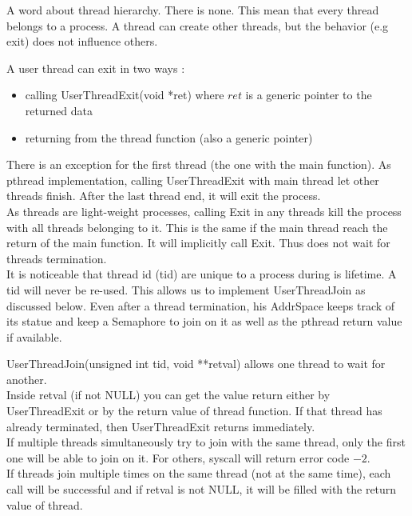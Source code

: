 A word about thread hierarchy. There is none. This mean that every thread
belongs to a process. A thread can create other threads, but the behavior (e.g
exit) does not influence others.

A user thread can exit in two ways :
\begin{itemize}
    \item calling \textrm{UserThreadExit(void *ret)} where $ret$ is a generic
        pointer to the returned data
    \item returning from the thread function (also a generic pointer)
\end{itemize}

There is an exception for the first thread (the one with the main function). As
pthread implementation, calling \textrm{UserThreadExit} with main thread let
other threads finish. After the last thread end, it will exit the process.\\

As threads are light-weight processes, calling \textrm{Exit} in any threads
kill the process with all threads belonging to it. This is the same if the main
thread reach the return of the main function. It will implicitly call
\textrm{Exit}. Thus does not wait for threads termination.\\

It is noticeable that thread id (tid) are unique to a process during is
lifetime. A tid will never be re-used. This allows us to implement
\textrm{UserThreadJoin} as discussed below. Even after a thread termination, his
AddrSpace keeps track of its statue and keep a Semaphore to join on it as well
as the pthread return value if available.

\textrm{UserThreadJoin(unsigned int tid, void **retval)} allows one thread to wait for
another.\\
Inside retval (if not NULL) you can get the value return either by
\textrm{UserThreadExit} or by the return value of thread function. If that
thread has already terminated, then \textrm{UserThreadExit} returns
immediately.\\
If multiple threads simultaneously try to join with the same thread, only the
first one will be able to join on it. For others, syscall will return error
code $-2$. \\
If threads join multiple times on the same thread (not at the same time), each
call will be successful and if retval is not NULL, it will be filled with the
return value of thread.\\

